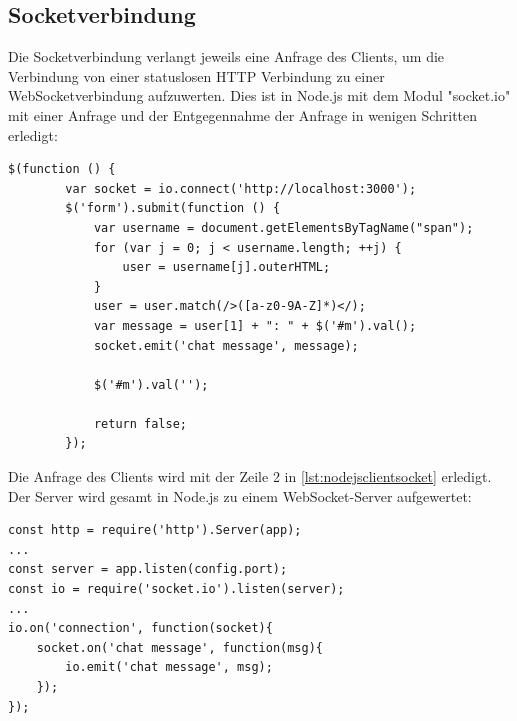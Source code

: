 \subsection{Socketverbindung}
Die Socketverbindung verlangt jeweils eine Anfrage des Clients, um die Verbindung von einer statuslosen HTTP Verbindung zu einer WebSocketverbindung aufzuwerten. Dies ist in Node.js mit dem Modul "socket.io" mit einer Anfrage und der Entgegennahme der Anfrage in wenigen Schritten erledigt:

\begin{lstlisting}
$(function () {
        var socket = io.connect('http://localhost:3000');
        $('form').submit(function () {
            var username = document.getElementsByTagName("span");
            for (var j = 0; j < username.length; ++j) {
                user = username[j].outerHTML;
            }
            user = user.match(/>([a-z0-9A-Z]*)</);
            var message = user[1] + ": " + $('#m').val();
            socket.emit('chat message', message);

            $('#m').val('');

            return false;
        });
\end{lstlisting}
Die Anfrage des Clients wird mit der Zeile 2 in \ref{lst:nodejsclientsocket} erledigt.\\
Der Server wird gesamt in Node.js zu einem WebSocket-Server aufgewertet:


\begin{lstlisting}
const http = require('http').Server(app);
...
const server = app.listen(config.port);
const io = require('socket.io').listen(server);
...
io.on('connection', function(socket){
    socket.on('chat message', function(msg){
        io.emit('chat message', msg);
    });
});
\end{lstlisting}

